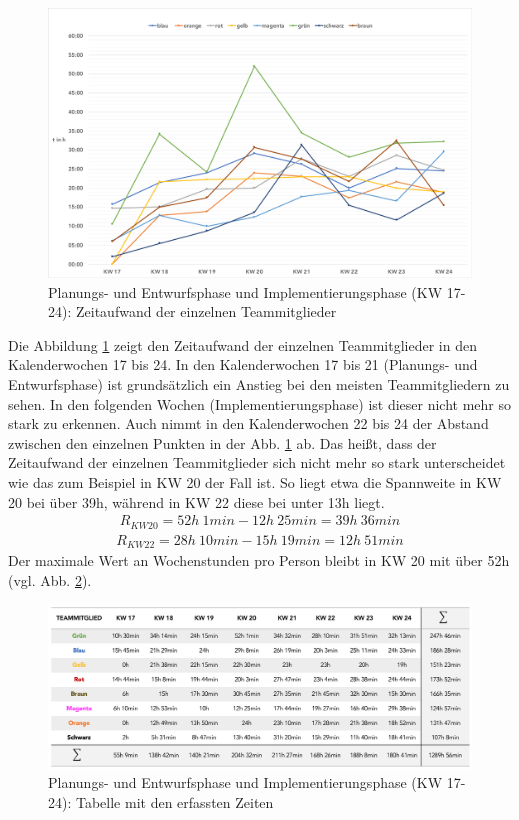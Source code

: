 \documentclass[../review_2.tex]{subfiles}
\begin{document}
\begin{figure} [h]
    \centering
    \includegraphics[width = \linewidth]{img/kimai10.pdf}
    \caption{Planungs- und Entwurfsphase und Implementierungsphase (KW 17-24): Zeitaufwand der einzelnen Teammitglieder}
    \label{kimai10}
\end{figure} 

Die Abbildung \ref{kimai10} zeigt den Zeitaufwand der einzelnen Teammitglieder in den Kalenderwochen 17 bis 24. In den Kalenderwochen 17 bis 21 (Planungs- und Entwurfsphase) ist grundsätzlich ein Anstieg bei den meisten Teammitgliedern zu sehen. In den folgenden Wochen (Implementierungsphase) ist dieser nicht mehr so stark zu erkennen. Auch nimmt in den Kalenderwochen 22 bis 24 der Abstand zwischen den einzelnen Punkten in der Abb. \ref{kimai10} ab. Das heißt, dass der Zeitaufwand der einzelnen Teammitglieder sich nicht mehr so stark unterscheidet wie das zum Beispiel in KW 20 der Fall ist. So liegt etwa die Spannweite in KW 20 bei über 39h, während in KW 22 diese bei unter 13h liegt.
\begin{align*}
    R_{KW20} = 52h\: 1min - 12h\: 25min = 39h\: 36min 
\end{align*}
\begin{align*}
   R_{KW22} = 28h\: 10min - 15h\: 19min = 12h\: 51min
\end{align*}
Der maximale Wert an Wochenstunden pro Person bleibt in KW 20 mit über 52h (vgl. Abb. \ref{kimai12}).

\begin{figure} [h]
    \centering
    \includegraphics[width = \linewidth]{img/kimai12.png}
    \caption{Planungs- und Entwurfsphase und Implementierungsphase (KW 17-24): Tabelle mit den erfassten Zeiten}
    \label{kimai12}
\end{figure} 
\end{document}
